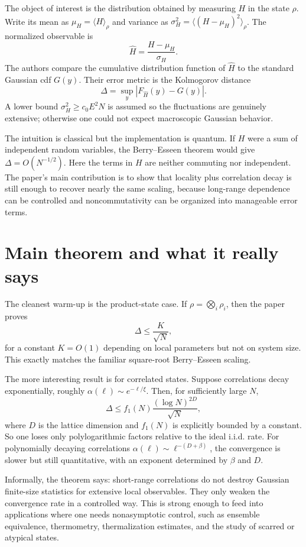 \documentclass[11pt]{article}
\begin{document}
The object of interest is the distribution obtained by measuring $H$ in the state $\rho$. Write its mean as $\mu_H=\langle H\rangle_\rho$ and variance as $\sigma_H^2 = \langle (H-\mu_H)^2\rangle_\rho$. The normalized observable is
\[
\widehat H = \frac{H-\mu_H}{\sigma_H}.
\]
The authors compare the cumulative distribution function of $\widehat H$ to the standard Gaussian cdf $G(y)$. Their error metric is the Kolmogorov distance
\[
\Delta = \sup_y |F_{\widehat H}(y)-G(y)|.
\]
A lower bound $\sigma_H^2 \ge c_0 E^2 N$ is assumed so the fluctuations are genuinely extensive; otherwise one could not expect macroscopic Gaussian behavior.

The intuition is classical but the implementation is quantum. If $H$ were a sum of independent random variables, the Berry--Esseen theorem would give $\Delta = O(N^{-1/2})$. Here the terms in $H$ are neither commuting nor independent. The paper's main contribution is to show that locality plus correlation decay is still enough to recover nearly the same scaling, because long-range dependence can be controlled and noncommutativity can be organized into manageable error terms.

\section*{Main theorem and what it really says}
The cleanest warm-up is the product-state case. If $\rho = \bigotimes_i \rho_i$, then the paper proves
\[
\Delta \le \frac{K}{\sqrt N},
\]
for a constant $K=O(1)$ depending on local parameters but not on system size. This exactly matches the familiar square-root Berry--Esseen scaling.

The more interesting result is for correlated states. Suppose correlations decay exponentially, roughly $\alpha(\ell)\sim e^{-\ell/\xi}$. Then, for sufficiently large $N$,
\[
\Delta \le f_1(N)\frac{(\log N)^{2D}}{\sqrt N},
\]
where $D$ is the lattice dimension and $f_1(N)$ is explicitly bounded by a constant. So one loses only polylogarithmic factors relative to the ideal i.i.d. rate. For polynomially decaying correlations $\alpha(\ell)\sim \ell^{-(D+\beta)}$, the convergence is slower but still quantitative, with an exponent determined by $\beta$ and $D$.

Informally, the theorem says: short-range correlations do not destroy Gaussian finite-size statistics for extensive local observables. They only weaken the convergence rate in a controlled way. This is strong enough to feed into applications where one needs nonasymptotic control, such as ensemble equivalence, thermometry, thermalization estimates, and the study of scarred or atypical states.
\end{document}
